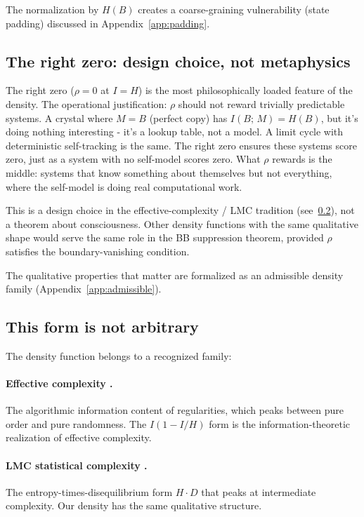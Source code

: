 \documentclass[12pt]{article}
\theoremstyle{remark}
\begin{document}
The normalization by $H(B)$ creates a coarse-graining vulnerability (state padding) discussed in Appendix~\ref{app:padding}.

\subsection{The right zero: design choice, not metaphysics}

The right zero ($\rho = 0$ at $I = H$) is the most philosophically loaded feature of the density. The operational justification: $\rho$ should not reward trivially predictable systems. A crystal where $M = B$ (perfect copy) has $I(B;\,M) = H(B)$, but it's doing nothing interesting - it's a lookup table, not a model. A limit cycle with deterministic self-tracking is the same. The right zero ensures these systems score zero, just as a system with no self-model scores zero. What $\rho$ rewards is the middle: systems that know something about themselves but not everything, where the self-model is doing real computational work.

This is a design choice in the effective-complexity / LMC tradition (see~\ref{sec:family}), not a theorem about consciousness. Other density functions with the same qualitative shape would serve the same role in the BB suppression theorem, provided $\rho$ satisfies the boundary-vanishing condition.

The qualitative properties that matter are formalized as an admissible density family (Appendix~\ref{app:admissible}).

\subsection{This form is not arbitrary}\label{sec:family}

The density function belongs to a recognized family:

\paragraph{Effective complexity \cite{gellmann-lloyd1996}.} The algorithmic information content of regularities, which peaks between pure order and pure randomness. The $I(1 - I/H)$ form is the information-theoretic realization of effective complexity.

\paragraph{LMC statistical complexity \cite{lmc1995}.} The entropy-times-disequilibrium form $H \cdot D$ that peaks at intermediate complexity. Our density has the same qualitative structure.
\end{document}
